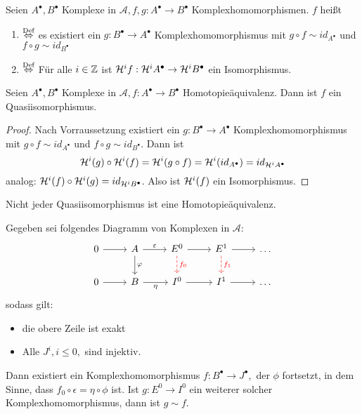 \begin{df}\label{7.12}
	Seien $A^{\bullet}, B^{\bullet} $ Komplexe in $\mathcal{A}, f,g: A^{\bullet} \to B^{\bullet} $ Komplexhomomorphismen. $f$ heißt
	\begin{enumerate}
	\item[]  $\overset{\text{Def}}{\Leftrightarrow} $ es existiert ein $g: B^{\bullet} \to A^{\bullet} $ Komplexhomomorphismus mit $g \circ f \sim id_{A^{\bullet}} $ und $f \circ g \sim id_{B^{\bullet}}$
	\item[]  $\overset{\text{Def}}{\Leftrightarrow} $ Für alle $i \in \mathbb{Z} $ ist $\mathcal{H}^if:  \mathcal{H}^iA^{\bullet} \to \mathcal{H}^iB^{\bullet} $ ein Isomorphismus.
\end{enumerate}
\end{df}
\begin{bem}\label{7.13}
	Seien $A^{\bullet}, B^{\bullet} $ Komplexe in $\mathcal{A}, f: A^{\bullet} \to B^{\bullet} $ Homotopieäquivalenz. Dann ist $f$ ein Quasiisomorphismus. 
\end{bem}
\begin{proof}
	Nach Vorraussetzung existiert ein $g: B^{\bullet} \to A^{\bullet} $ Komplexhomomorphismus mit $g \circ f \sim id_{A^{\bullet}} $ und $f \circ g \sim id_{B^{\bullet}}$. Dann ist
	$$\mathcal{H}^i(g) \circ \mathcal{H}^i(f) = \mathcal{H}^i(g \circ f ) = \mathcal{H}^i(id_{A^{\bullet}}) = id_{\mathcal{H}^iA^{\bullet}}$$
	analog: $\mathcal{H}^i(f) \circ \mathcal{H}^i(g) = id_{\mathcal{H}^iB^{\bullet}}$. Also ist  $\mathcal{H}^i(f) $ ein Isomorphismus.
\end{proof}
\begin{anm}
	Nicht jeder Quasiisomorphismus ist eine Homotopieäquivalenz.
\end{anm}
\begin{sa}\label{7.14}
	Gegeben sei folgendes Diagramm von Komplexen in $\mathcal{A} $: \\
	$$\begin{tikzcd}
	0 \arrow{r} & A \arrow{d}{\phi} \arrow{r}{\epsilon}& E^0 \arrow[dashed,red]{d}{f_0}\arrow{r} & E^1 \arrow[dashed,red]{d}{f_1} \arrow{r} & \ldots\\
	0 \arrow{r} & B \arrow[swap]{r}{\eta} & I^0 \arrow[swap]{r} & I^1 \arrow{r} & \ldots
	\end{tikzcd}$$
	sodass gilt: \begin{itemize}
		\item die obere Zeile ist exakt
		\item Alle $J^i, i \leq 0,$ sind injektiv.
	\end{itemize}
	Dann existiert ein Komplexhomomorphismus $f: B^{\bullet} \to J^{\bullet}, $ der $\phi$ fortsetzt, in dem Sinne, dass $ f_0 \circ \epsilon = \eta \circ \phi $ ist. Ist $g:E^{0} \to I^0 $ ein weiterer solcher Komplexhomomorphismus, dann ist $g \sim f$.
\end{sa}
